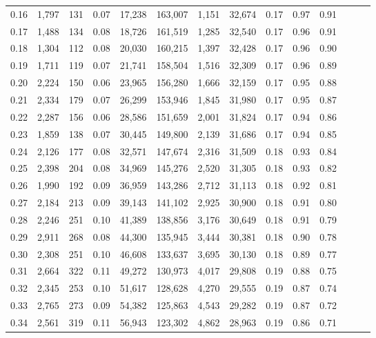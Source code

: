 \begin{tabular}{rrrrrrrrrrrrrr}
0.16 &  1,797 &  131 &  0.07 &   17,238 &  163,007 &   1,151 &  32,674 &  0.17 &  0.97 &      0.91 \\
0.17 &  1,488 &  134 &  0.08 &   18,726 &  161,519 &   1,285 &  32,540 &  0.17 &  0.96 &      0.91 \\
0.18 &  1,304 &  112 &  0.08 &   20,030 &  160,215 &   1,397 &  32,428 &  0.17 &  0.96 &      0.90 \\
0.19 &  1,711 &  119 &  0.07 &   21,741 &  158,504 &   1,516 &  32,309 &  0.17 &  0.96 &      0.89 \\
0.20 &  2,224 &  150 &  0.06 &   23,965 &  156,280 &   1,666 &  32,159 &  0.17 &  0.95 &      0.88 \\
0.21 &  2,334 &  179 &  0.07 &   26,299 &  153,946 &   1,845 &  31,980 &  0.17 &  0.95 &      0.87 \\
0.22 &  2,287 &  156 &  0.06 &   28,586 &  151,659 &   2,001 &  31,824 &  0.17 &  0.94 &      0.86 \\
0.23 &  1,859 &  138 &  0.07 &   30,445 &  149,800 &   2,139 &  31,686 &  0.17 &  0.94 &      0.85 \\
0.24 &  2,126 &  177 &  0.08 &   32,571 &  147,674 &   2,316 &  31,509 &  0.18 &  0.93 &      0.84 \\
0.25 &  2,398 &  204 &  0.08 &   34,969 &  145,276 &   2,520 &  31,305 &  0.18 &  0.93 &      0.82 \\
0.26 &  1,990 &  192 &  0.09 &   36,959 &  143,286 &   2,712 &  31,113 &  0.18 &  0.92 &      0.81 \\
0.27 &  2,184 &  213 &  0.09 &   39,143 &  141,102 &   2,925 &  30,900 &  0.18 &  0.91 &      0.80 \\
0.28 &  2,246 &  251 &  0.10 &   41,389 &  138,856 &   3,176 &  30,649 &  0.18 &  0.91 &      0.79 \\
0.29 &  2,911 &  268 &  0.08 &   44,300 &  135,945 &   3,444 &  30,381 &  0.18 &  0.90 &      0.78 \\
0.30 &  2,308 &  251 &  0.10 &   46,608 &  133,637 &   3,695 &  30,130 &  0.18 &  0.89 &      0.77 \\
0.31 &  2,664 &  322 &  0.11 &   49,272 &  130,973 &   4,017 &  29,808 &  0.19 &  0.88 &      0.75 \\
0.32 &  2,345 &  253 &  0.10 &   51,617 &  128,628 &   4,270 &  29,555 &  0.19 &  0.87 &      0.74 \\
0.33 &  2,765 &  273 &  0.09 &   54,382 &  125,863 &   4,543 &  29,282 &  0.19 &  0.87 &      0.72 \\
0.34 &  2,561 &  319 &  0.11 &   56,943 &  123,302 &   4,862 &  28,963 &  0.19 &  0.86 &      0.71 \\

\end{tabular}
